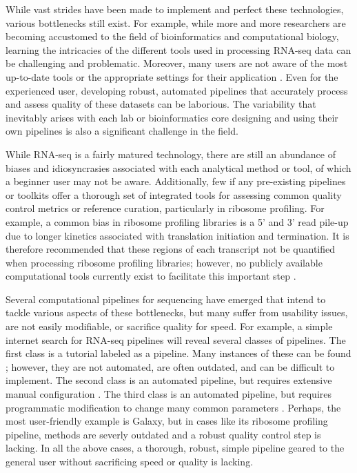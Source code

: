 \documentclass[11pt, a4paper, oneside]{article}
\begin{document}
While vast strides have been made to implement and perfect these technologies, various bottlenecks still exist. For example, while more and more researchers are becoming accustomed to  the field of bioinformatics and computational biology, learning the intricacies of the different tools used in processing RNA-seq data can be challenging and problematic. Moreover, many users are not aware of the most up-to-date tools or the appropriate settings for their application \cite{costello_npjsba, funari_science}. Even for the experienced user, developing robust, automated pipelines that accurately process and assess quality of these datasets can be laborious. The variability that inevitably arises with each lab or bioinformatics core designing and using their own pipelines is also a significant challenge in the field. \par

While RNA-seq is a fairly matured technology, there are still an abundance of biases and idiosyncrasies associated with each analytical method or tool, of which a beginner user may not be aware. Additionally, few if any pre-existing pipelines or toolkits offer a thorough set of integrated tools for assessing common quality control metrics or reference curation, particularly in ribosome profiling. For example, a common bias in ribosome profiling libraries is a 5' and 3' read pile-up \cite{gerashchenko_nar, artieri_gr, hussman_plosg} due to longer kinetics associated with translation initiation and termination. It is therefore recommended that these regions of each transcript not be quantified when processing ribosome profiling libraries; however, no publicly available computational tools currently exist to facilitate this important step \cite{ingolia_meth, weinberg_reports}. \par

Several computational pipelines for sequencing have emerged that intend to tackle various aspects of these bottlenecks, but many suffer from usability issues, are not easily modifiable, or sacrifice quality for speed. For example, a simple internet search for RNA-seq pipelines will reveal several classes of pipelines. The first class is a tutorial labeled as a pipeline. Many instances of these can be found \cite{encode_pipeline, gdc_pipeline}; however, they are not automated, are often outdated, and can be difficult to implement. The second class is an automated pipeline, but requires extensive manual configuration \cite{pavlidis_pipeline, nfcore_pipeline, umcu_pipeline, cellgeni_pipeline}. The third class is an automated pipeline, but requires programmatic modification to change many common parameters \cite{dnanexus_pipeline, nextflow_pipeline}. Perhaps, the most user-friendly example is Galaxy, but in cases like its ribosome profiling pipeline, methods are severly outdated and a robust quality control step is lacking. In all the above cases, a thorough, robust, simple pipeline geared to the general user without sacrificing speed or quality is lacking. \par
\end{document}
